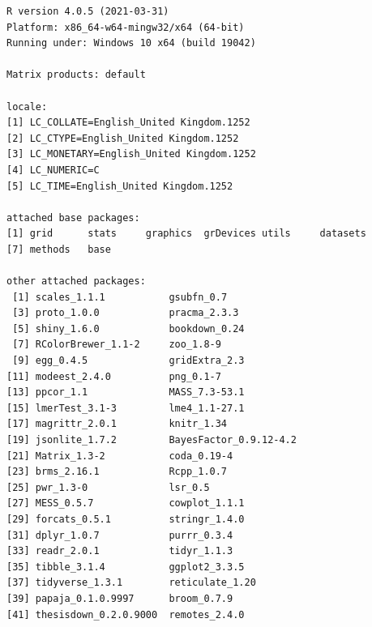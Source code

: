\documentclass[12pt,twoside]{reedthesis}
\begin{document}
\begin{verbatim}
R version 4.0.5 (2021-03-31)
Platform: x86_64-w64-mingw32/x64 (64-bit)
Running under: Windows 10 x64 (build 19042)

Matrix products: default

locale:
[1] LC_COLLATE=English_United Kingdom.1252 
[2] LC_CTYPE=English_United Kingdom.1252   
[3] LC_MONETARY=English_United Kingdom.1252
[4] LC_NUMERIC=C                           
[5] LC_TIME=English_United Kingdom.1252    

attached base packages:
[1] grid      stats     graphics  grDevices utils     datasets 
[7] methods   base     

other attached packages:
 [1] scales_1.1.1           gsubfn_0.7            
 [3] proto_1.0.0            pracma_2.3.3          
 [5] shiny_1.6.0            bookdown_0.24         
 [7] RColorBrewer_1.1-2     zoo_1.8-9             
 [9] egg_0.4.5              gridExtra_2.3         
[11] modeest_2.4.0          png_0.1-7             
[13] ppcor_1.1              MASS_7.3-53.1         
[15] lmerTest_3.1-3         lme4_1.1-27.1         
[17] magrittr_2.0.1         knitr_1.34            
[19] jsonlite_1.7.2         BayesFactor_0.9.12-4.2
[21] Matrix_1.3-2           coda_0.19-4           
[23] brms_2.16.1            Rcpp_1.0.7            
[25] pwr_1.3-0              lsr_0.5               
[27] MESS_0.5.7             cowplot_1.1.1         
[29] forcats_0.5.1          stringr_1.4.0         
[31] dplyr_1.0.7            purrr_0.3.4           
[33] readr_2.0.1            tidyr_1.1.3           
[35] tibble_3.1.4           ggplot2_3.3.5         
[37] tidyverse_1.3.1        reticulate_1.20       
[39] papaja_0.1.0.9997      broom_0.7.9           
[41] thesisdown_0.2.0.9000  remotes_2.4.0         


\end{verbatim}
\end{document}
